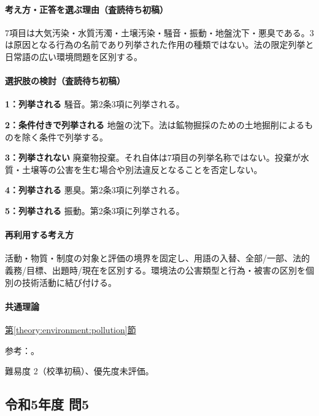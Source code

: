 \paragraph{考え方・正答を選ぶ理由（査読待ち初稿）} 7項目は大気汚染・水質汚濁・土壌汚染・騒音・振動・地盤沈下・悪臭である。3は原因となる行為の名前であり列挙された作用の種類ではない。法の限定列挙と日常語の広い環境問題を区別する。

\paragraph{選択肢の検討（査読待ち初稿）}\mbox{}\par

\noindent\textbf{1：列挙される} 騒音。第2条3項に列挙される。\par

\noindent\textbf{2：条件付きで列挙される} 地盤の沈下。法は鉱物掘採のための土地掘削によるものを除く条件で列挙する。\par

\noindent\textbf{3：列挙されない} 廃棄物投棄。それ自体は7項目の列挙名称ではない。投棄が水質・土壌等の公害を生む場合や別法違反となることを否定しない。\par

\noindent\textbf{4：列挙される} 悪臭。第2条3項に列挙される。\par

\noindent\textbf{5：列挙される} 振動。第2条3項に列挙される。\par

\paragraph{再利用する考え方} 活動・物質・制度の対象と評価の境界を固定し、用語の入替、全部/一部、法的義務/目標、出題時/現在を区別する。環境法の公害類型と行為・被害の区別を個別の技術活動に結び付ける。

\paragraph{共通理論} \hyperref[theory:environment:pollution]{第\ref*{theory:environment:pollution}節}

\par 参考：\cite{env_pollution}。

\par 難易度 2（校準初稿）、優先度未評価。

\subsection{令和5年度 問5}
\label{q:r05-reg-apt-05}

